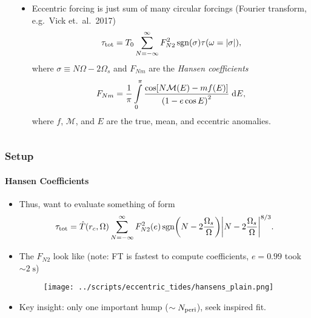 \documentclass[dvipsnames,8pt]{beamer}
\DeclareMathOperator{\sgn}{sgn}
\DeclarePairedDelimiter\abs{\lvert}{\rvert}
\DeclarePairedDelimiter\p{\lparen}{\rparen}
\DeclarePairedDelimiter\s{\lbrack}{\rbrack}
\begin{document}
\begin{frame}
\begin{columns}
\begin{column}{0.5\textwidth}
\begin{itemize}
            \end{itemize}
        \end{column}
        \begin{column}{0.5\textwidth}
            \begin{itemize}
                \item Eccentric forcing is just sum of many circular forcings
                    (Fourier transform, e.g.\ Vick et.\ al.\ 2017)
                    \begin{equation*}
                        \tau_{\rm tot} = T_0 \sum\limits_{N = -\infty}^\infty
                            F_{N2}^2 \sgn\p*{\sigma} \tau
                                \p*{\omega = \abs*{\sigma}},
                    \end{equation*}
                    where $\sigma \equiv N\Omega - 2\Omega_s$ and $F_{Nm}$ are
                    the \emph{Hansen coefficients}
                    \begin{equation*}
                        F_{Nm} = \frac{1}{\pi}\int\limits_{0}^{\pi}
                            \frac{\cos\s*{N\mathcal{M}(E) - mf(E)}}
                                {\p*{1 - e\cos E}^2}\;\mathrm{d}E,
                    \end{equation*}
                    where $f$, $\mathcal{M}$, and $E$ are the true, mean, and
                    eccentric anomalies.
            \end{itemize}
        \end{column}
    \end{columns}
\end{frame}

\begin{frame}
    \frametitle{Setup}
    \framesubtitle{Hansen Coefficients}

    \begin{itemize}
        \item Thus, want to evaluate something of form
            \begin{equation*}
                \tau_{\rm tot} = \hat{T}(r_c, \Omega)
                    \sum\limits_{N = -\infty}^\infty F_{N2}^2(e)
                        \sgn\p*{N - 2\frac{\Omega_s}{\Omega}}
                        \abs*{N - 2\frac{\Omega_s}{\Omega}}^{8/3}.
            \end{equation*}
        \item The $F_{N2}$ look like (note: FT is fastest to compute
            coefficients, $e = 0.99$ took $\sim 2\;\mathrm{s}$)
            \begin{figure}[h]
                \centering
                \texttt{[image: ../scripts/eccentric\_tides/hansens\_plain.png]}
            \end{figure}
        \item Key insight: only one important hump ($\sim N_{\rm peri}$), seek
            inspired fit.
    \end{itemize}
\end{frame}
\end{document}
